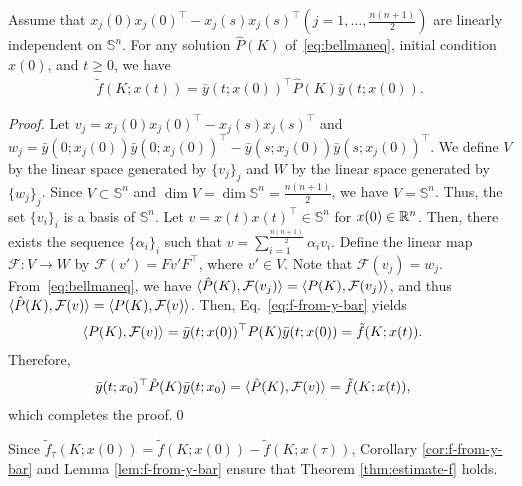 \begin{lemma} \label{lem:f-from-y-bar}
  Assume that $x_j(0)x_j(0)^\top - x_j(s)x_j(s)^\top(j=1, \dots, \frac{n(n+1)}{2})$
  are linearly independent on $\mathbb{S}^n$.
  For any solution $\hat P(K)$ of~\eqref{eq:bellmaneq}, initial condition $x(0)$, and $t \geq 0$,
  we have
  \begin{align}
    \tilde f(K;x(t)) = \bar y(t;x(0))^\top \hat P(K)\bar y(t;x(0)).
  \end{align}
\end{lemma}
\begin{proof}
  Let $v_j = x_j(0)x_j(0)^\top - x_j(s)x_j(s)^\top$
  and $w_j = \bar{y}(0;x_j(0))\bar{y}(0;x_j(0))^\top - \bar{y}(s;x_j(0)) \bar{y}(s;x_j(0))^\top$.
  We define $V$ by the linear space generated by $\{v_j\}_j$ and $W$ by the linear space generated by $\{w_j\}_j$.
  Since $V \subset \mathbb{S}^n$ and $\dim V = \dim \mathbb{S}^n = \frac{n(n+1)}{2}$, we have $V = \mathbb{S}^n$.
  Thus, the set $\{v_i\}_i$ is a basis of $\mathbb{S}^n$.
  Let $v = x(t)x(t)^\top\in \mathbb{S}^n$ for $x(0)\in \mathbb{R}^n$.
  Then, there exists the sequence $\{\alpha_i\}_i$ such that
    $v  = \sum_{i=1}^{\frac{n(n+1)}{2}} \alpha_i v_i$.
  Define the linear map $\mathcal{F}:V\to W$ by
    $\mathcal{F}(v')  = Fv'F^\top$,
  where $v'\in V$.
  Note that $\mathcal{F}(v_j) = w_j$.
  From~\eqref{eq:bellmaneq}, we have
    $\q<\hat P(K), \mathcal F(v_j)> = \q<P(K), \mathcal F(v_j)>$, and thus
    $\q<\hat P(K), \mathcal F(v)> =\q<P(K), \mathcal F(v)>$.
  Then, Eq.~\eqref{eq:f-from-y-bar} yields
  \begin{align}
    \q<P(K), \mathcal F(v)> & = \bar y(t;x(0))^\top P(K)\bar y(t;x(0))  = \tilde f(K;x(t)).
  \end{align}
  Therefore,
  \begin{align}
    \bar y(t;x_0)^\top \hat P(K)\bar y(t;x_0) &= \q<\hat P(K), \mathcal F(v)>%
    = \tilde f(K;x(t)),
  \end{align}
  which completes the proof.\qed
\end{proof}


Since $\tilde f_\tau(K;x(0)) = \tilde f(K;x(0)) - \tilde f(K;x(\tau))$, Corollary \ref{cor:f-from-y-bar} and Lemma \ref{lem:f-from-y-bar} ensure that Theorem \ref{thm:estimate-f} holds.

